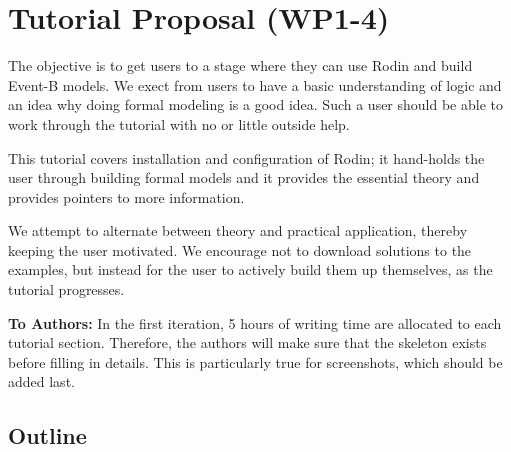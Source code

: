 \section*{Tutorial Proposal (WP1-4)}

The objective is to get users to a stage where they can use Rodin and build Event-B models.  We exect from users to have a basic understanding of logic and an idea why doing formal modeling is a good idea.  Such a user should be able to work through the tutorial with no or little outside help.

This tutorial covers installation and configuration of Rodin; it hand-holds the user through building formal models and it provides the essential theory and provides pointers to more information.

We attempt to alternate between theory and practical application, thereby keeping the user motivated.  We encourage not to download solutions to the examples, but instead for the user to actively build them up themselves, as the tutorial progresses.

\textbf{To Authors:} In the first iteration, 5 hours of writing time are allocated to each tutorial section.  Therefore, the authors will make sure that the skeleton exists before filling in details.
This is particularly true for screenshots, which should be added last.

\subsection*{Outline}

